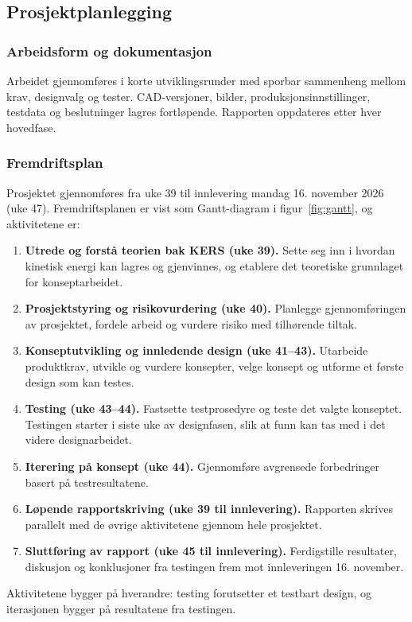 \subsection{Prosjektplanlegging}
\label{sec:prosjektplan}
\subsubsection{Arbeidsform og dokumentasjon}
Arbeidet gjennomføres i korte utviklingsrunder med sporbar sammenheng mellom krav, designvalg og tester. CAD-versjoner, bilder, produksjonsinnstillinger, testdata og beslutninger lagres fortløpende. Rapporten oppdateres etter hver hovedfase.

\subsubsection{Fremdriftsplan}
Prosjektet gjennomføres fra uke 39 til innlevering mandag 16. november 2026 (uke 47). Fremdriftsplanen er vist som Gantt-diagram i figur~\ref{fig:gantt}, og aktivitetene er:
\begin{enumerate}
    \item \textbf{Utrede og forstå teorien bak KERS (uke 39).} Sette seg inn i hvordan kinetisk energi kan lagres og gjenvinnes, og etablere det teoretiske grunnlaget for konseptarbeidet.
    \item \textbf{Prosjektstyring og risikovurdering (uke 40).} Planlegge gjennomføringen av prosjektet, fordele arbeid og vurdere risiko med tilhørende tiltak.
    \item \textbf{Konseptutvikling og innledende design (uke 41--43).} Utarbeide produktkrav, utvikle og vurdere konsepter, velge konsept og utforme et første design som kan testes.
    \item \textbf{Testing (uke 43--44).} Fastsette testprosedyre og teste det valgte konseptet. Testingen starter i siste uke av designfasen, slik at funn kan tas med i det videre designarbeidet.
    \item \textbf{Iterering på konsept (uke 44).} Gjennomføre avgrensede forbedringer basert på testresultatene.
    \item \textbf{Løpende rapportskriving (uke 39 til innlevering).} Rapporten skrives parallelt med de øvrige aktivitetene gjennom hele prosjektet.
    \item \textbf{Sluttføring av rapport (uke 45 til innlevering).} Ferdigstille resultater, diskusjon og konklusjoner fra testingen frem mot innleveringen 16. november.
\end{enumerate}
Aktivitetene bygger på hverandre: testing forutsetter et testbart design, og iterasjonen bygger på resultatene fra testingen.

